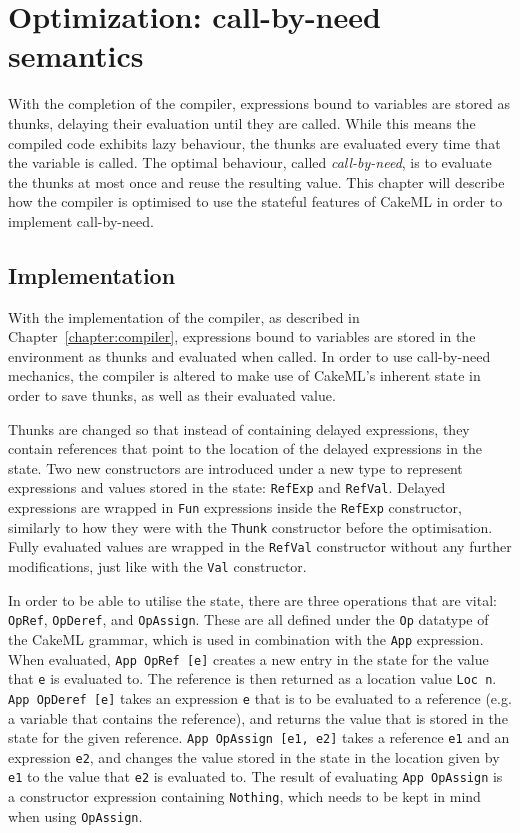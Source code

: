 \chapter{Optimization: call-by-need semantics}
With the completion of the compiler, expressions bound to variables are stored
as thunks, delaying their evaluation until they are called. While this means
the compiled code exhibits lazy behaviour, the thunks are evaluated every
time that the variable is called. The optimal behaviour, called
\textit{call-by-need}, is to evaluate the thunks at most once and reuse the
resulting value. This chapter will describe how the compiler is optimised to
use the stateful features of CakeML in order to implement call-by-need.

\section{Implementation}
\label{cbn:impl}
With the implementation of the compiler, as described in
Chapter~\ref{chapter:compiler}, expressions bound to variables are stored
in the environment as thunks and evaluated when called. In order to use
call-by-need mechanics, the compiler is altered to make use of CakeML's
inherent state in order to save thunks, as well as their evaluated value.

Thunks are changed so that instead of containing delayed expressions, they
contain references that point to the location of the delayed expressions in
the state. Two new constructors are introduced under a new type to represent
expressions and values stored in the state: \texttt{RefExp} and \texttt{RefVal}.
Delayed expressions are wrapped in \texttt{Fun} expressions inside the
\texttt{RefExp} constructor, similarly to how they were with the \texttt{Thunk}
constructor before the optimisation. Fully evaluated values are wrapped in the
\texttt{RefVal} constructor without any further modifications, just like with
the \texttt{Val} constructor.

In order to be able to utilise the state, there are three operations that are
vital: \texttt{OpRef}, \texttt{OpDeref}, and \texttt{OpAssign}. These are all
defined under the \texttt{Op} datatype of the CakeML grammar, which is used
in combination with
the \texttt{App} expression. When evaluated, \texttt{App OpRef [e]} creates a new
entry in the state for the value that \texttt{e} is evaluated to. The reference
is then returned as a location value \texttt{Loc n}. \texttt{App OpDeref [e]}
takes an expression \texttt{e} that is to be evaluated to a reference (e.g. a
variable that contains the reference), and returns the value that is stored in
the state for the given reference. \texttt{App OpAssign [e1, e2]} takes a
reference \texttt{e1} and an expression \texttt{e2}, and changes the value
stored in the state in the location given by \texttt{e1} to the value that
\texttt{e2} is evaluated to. The result of evaluating \texttt{App OpAssign}
is a constructor expression containing \texttt{Nothing}, which needs to be
kept in mind when using \texttt{OpAssign}.

